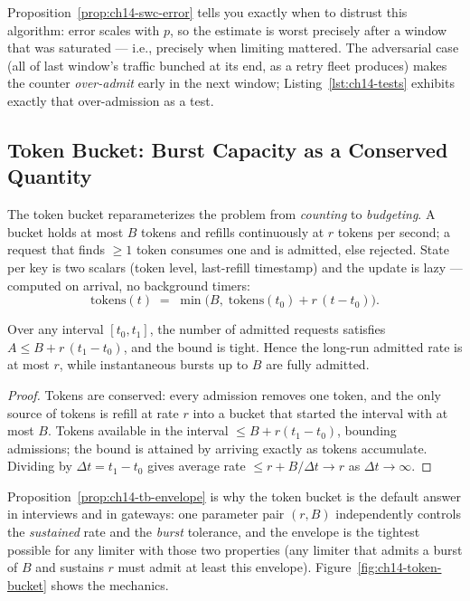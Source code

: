Proposition~\ref{prop:ch14-swc-error} tells you exactly when to distrust
this algorithm: error scales with $p$, so the estimate is worst precisely
after a window that was saturated --- i.e., precisely when limiting
mattered. The adversarial case (all of last window's traffic bunched at its
end, as a retry fleet produces) makes the counter \emph{over-admit} early in
the next window; Listing~\ref{lst:ch14-tests} exhibits exactly that
over-admission as a test.

\subsection{Token Bucket: Burst Capacity as a Conserved Quantity}
\label{subsec:ch14-token-bucket}

The token bucket reparameterizes the problem from \emph{counting} to
\emph{budgeting}. A bucket holds at most $B$ tokens and refills
continuously at $r$ tokens per second; a request that finds $\ge 1$ token
consumes one and is admitted, else rejected. State per key is two scalars
(token level, last-refill timestamp) and the update is lazy --- computed on
arrival, no background timers:
\begin{equation}
  \mathrm{tokens}(t) \;=\; \min\!\bigl(B,\; \mathrm{tokens}(t_0) + r\,(t - t_0)\bigr).
  \label{eq:ch14-tb-refill}
\end{equation}

\begin{proposition}
\label{prop:ch14-tb-envelope}
Over any interval $[t_0, t_1]$, the number of admitted requests satisfies
$A \le B + r\,(t_1 - t_0)$, and the bound is tight. Hence the long-run
admitted rate is at most $r$, while instantaneous bursts up to $B$ are
fully admitted.
\end{proposition}

\begin{proof}
Tokens are conserved: every admission removes one token, and the only
source of tokens is refill at rate $r$ into a bucket that started the
interval with at most $B$. Tokens available in the interval $\le B +
r(t_1 - t_0)$, bounding admissions; the bound is attained by arriving
exactly as tokens accumulate. Dividing by $\Delta t = t_1 - t_0$ gives
average rate $\le r + B/\Delta t \to r$ as $\Delta t \to \infty$.
\end{proof}

Proposition~\ref{prop:ch14-tb-envelope} is why the token bucket is the
default answer in interviews and in gateways: one parameter pair $(r, B)$
independently controls the \emph{sustained} rate and the \emph{burst}
tolerance, and the envelope is the tightest possible for any limiter with
those two properties (any limiter that admits a burst of $B$ and sustains
$r$ must admit at least this envelope). Figure~\ref{fig:ch14-token-bucket}
shows the mechanics.

